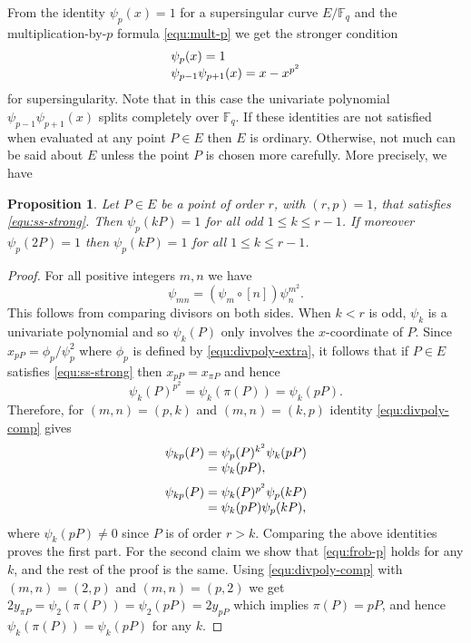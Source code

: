 \documentclass[11pt]{article}
\theoremstyle{plain}
\newtheorem{proposition}[theorem]{Proposition}
\theoremstyle{definition}
\def\F{\ensuremath{\mathbb{F}}}
\begin{document}
From the identity $\psi_p(x) = 1$ for a supersingular curve $E/\F_q$ and the multiplication-by-$p$ 
formula \eqref{equ:mult-p} we get the stronger condition
\begin{equation}
\label{equ:ss-strong}
	\arraycolsep=1.4pt
	\begin{array}{l}
		\psi_p(x) = 1 \\
		\psi_{p - 1}\psi_{p + 1}(x) = x - x^{p^2}
	\end{array}
\end{equation}
for supersingularity. Note that in this case the univariate polynomial $\psi_{p - 1}\psi_{p + 
1}(x)$ splits completely over $\F_q$. If these identities are not satisfied when evaluated at any 
point $P \in E$ then $E$ is ordinary. Otherwise, not much can be said about $E$ unless the point 
$P$ is chosen more carefully. More precisely, we have
\begin{proposition}
	Let $P \in E$ be a point of order $r$, with $(r, p) = 1$, that satisfies \eqref{equ:ss-strong}. 
	Then $\psi_p(kP) = 1$ for all odd $1 \le k \le r - 1$. If moreover $\psi_p(2P) = 1$ then 
	$\psi_p(kP) = 1$ for all $1 \le k \le r - 1$.
\end{proposition}
\begin{proof}
	For all positive integers $m, n$ we have
	\begin{equation}
	\label{equ:divpoly-comp}
		\psi_{mn} = (\psi_m \circ [n])\psi_n^{m^2}.
	\end{equation}
	This follows from comparing divisors on both sides. When $k < r$ is odd, $\psi_k$ is a 
	univariate polynomial and so $\psi_k(P)$ only involves the $x$-coordinate of $P$. Since $x_{pP} 
	= \phi_p / \psi_p^2$ where $\phi_p$ is defined by \eqref{equ:divpoly-extra}, it follows that if 
	$P \in E$ satisfies \eqref{equ:ss-strong} then $x_{pP} = x_{\pi P}$ and hence 
	\begin{equation}
	\label{equ:frob-p}
		\psi_k(P)^{p^2} = \psi_k(\pi(P)) = \psi_k(pP).
	\end{equation}
	Therefore, for $(m, n) = (p, k)$ and $(m, n) = (k, p)$ identity \eqref{equ:divpoly-comp} gives
	\[
	\arraycolsep=1.4pt
	\begin{array}{rll}
		\psi_{kp}(P) & = & \psi_p(P)^{k^2} \psi_k(pP) \\
		& = & \psi_k(pP), \vspace*{2mm} \\		 
		\psi_{kp}(P) & = & \psi_k(P)^{p^2} \psi_p(kP) \\
		& = & \psi_k(pP) \psi_p(kP), \\
	\end{array}
	\]
	where $\psi_k(pP) \ne 0$ since $P$ is of order $r > k$. Comparing the above identities proves 
	the first part. For the second claim we show that \eqref{equ:frob-p} holds for any $k$, and the 
	rest of the proof is the same. Using \eqref{equ:divpoly-comp} with $(m, n) = (2, p)$ and $(m, 
	n) = (p, 2)$ we get $2y_{\pi P} = \psi_2(\pi(P)) = \psi_2(pP) = 2y_{pP}$ which implies $\pi(P) 
	= pP$, and hence $\psi_k(\pi(P)) = \psi_k(pP)$ for any $k$.
\end{proof}
\end{document}
